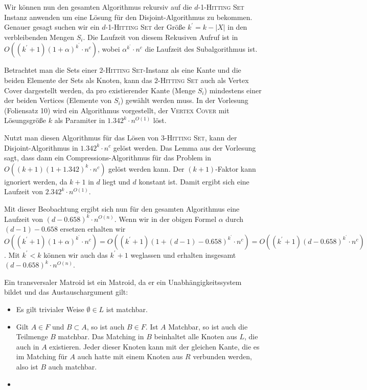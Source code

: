 Wir können nun den gesamten Algorithmus rekursiv auf die $d$-1-\textsc{Hitting Set} Instanz anwenden um eine Lösung für den Disjoint-Algorithmus zu bekommen. Genauer gesagt suchen wir ein $d$-1-\textsc{Hitting Set} der Größe $k^\prime = k - |X|$ in den verbleibenden Mengen $S_i$.
Die Laufzeit von diesem Rekusiven Aufruf ist in $O((k^\prime+1)(1+\alpha)^{k^\prime} \cdot n^c)$, wobei $\alpha^{k^\prime} \cdot n^c$ die Laufzeit des Subalgorithmus ist. 

Betrachtet man die Sets einer $2$-\textsc{Hitting Set}-Instanz als eine Kante und die beiden Elemente der Sets als Knoten, kann das $2$-\textsc{Hitting Set} auch als Vertex Cover dargestellt werden, da pro existierender Kante (Menge $S_i$) mindestens einer der beiden Vertices (Elemente von $S_i$) gewählt werden muss. In der Vorlesung (Foliensatz 10) wird ein Algorithmus vorgestellt, der \textsc{Vertex Cover} mit Lösungsgröße $k$ als Paramiter in $1.342^k \cdot n^{O(1)}$ löst. 

Nutzt man diesen Algorithmus für das Lösen von $3$-\textsc{Hitting Set}, kann der Disjoint-Algorithmus in $1.342^k \cdot n^c$ gelöst werden. Das Lemma aus der Vorlesung sagt, dass dann ein Compressions-Algorithmus für das Problem in $O((k+1)(1+1.342)^k \cdot n^c)$ gelöst werden kann. Der $(k+1)$-Faktor kann ignoriert werden, da $k+1$ in $d$ liegt und $d$ konstant ist. Damit ergibt sich eine Laufzeit von $2.342^k \cdot n^{O(1)}$.

Mit dieser Beobachtung ergibt sich nun für den gesamten Algorithmus eine Laufzeit von $(d-0.658)^k \cdot n^{O(n)}$. Wenn wir in der obigen Formel $\alpha$ durch $(d-1)-0.658$ ersetzen erhalten wir $O((k^\prime+1)(1+\alpha)^{k^\prime} \cdot n^c) = O((k^\prime+1)(1+(d-1)-0.658)^{k^\prime} \cdot n^c) = O((k^\prime+1)(d-0.658)^{k^\prime} \cdot n^c)$. Mit $k^\prime < k$ können wir auch das $k^\prime + 1$ weglassen und erhalten insgesamt $(d-0.658)^k \cdot n^{O(n)}$.


\how



Ein transversaler Matroid ist ein Matroid, da er ein Unabhängigkeitssystem bildet und das Austauschargument gilt:

\begin{itemize}
\item Es gilt trivialer Weise $\emptyset \in L$ ist matchbar.

\item Gilt $A \in F$ und $B \subset A$, so ist auch $B \in F$. Ist $A$ Matchbar, so ist auch die Teilmenge $B$ matchbar. Das Matching in $B$ beinhaltet alle Knoten aus $L$, die auch in $A$ existieren. Jeder dieser Knoten kann mit der gleichen Kante, die es im Matching für $A$ auch hatte mit einem Knoten aus $R$ verbunden werden, also ist $B$ auch matchbar.

\item 
\end{itemize}

\subexercise
\subexercise



